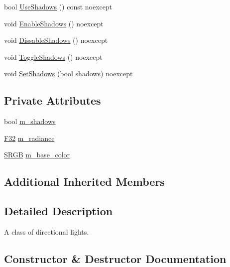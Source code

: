 \begin{DoxyCompactItemize}
\item 
bool \hyperlink{classmage_1_1_directional_light_a645e7f3d3e4dc4ebf11d7a6aa6950a18}{Use\+Shadows} () const noexcept
\item 
void \hyperlink{classmage_1_1_directional_light_a36436d5d99ccf6a0e49e81f26c3f9bc7}{Enable\+Shadows} () noexcept
\item 
void \hyperlink{classmage_1_1_directional_light_addd4803dee85892dfd57f51e155c6572}{Dissable\+Shadows} () noexcept
\item 
void \hyperlink{classmage_1_1_directional_light_a1c15d8e42526ed5ae7568cff5c7b25e0}{Toggle\+Shadows} () noexcept
\item 
void \hyperlink{classmage_1_1_directional_light_ab70b4298dc6616dbe22446e8e3298424}{Set\+Shadows} (bool shadows) noexcept
\end{DoxyCompactItemize}
\subsection*{Private Attributes}
\begin{DoxyCompactItemize}
\item 
bool \hyperlink{classmage_1_1_directional_light_a607a3dc01ee180f2044fe154c2b73903}{m\+\_\+shadows}
\item 
\hyperlink{namespacemage_aa97e833b45f06d60a0a9c4fc22ae02c0}{F32} \hyperlink{classmage_1_1_directional_light_aedba48c9e2590284f804ba7cc6225ec3}{m\+\_\+radiance}
\item 
\hyperlink{structmage_1_1_s_r_g_b}{S\+R\+GB} \hyperlink{classmage_1_1_directional_light_ad482c82fc399192409e24c03de2d2917}{m\+\_\+base\+\_\+color}
\end{DoxyCompactItemize}
\subsection*{Additional Inherited Members}


\subsection{Detailed Description}
A class of directional lights. 

\subsection{Constructor \& Destructor Documentation}
\hypertarget{classmage_1_1_directional_light_a688b26cb1d12d55258ae34bbac498465}{}\label{classmage_1_1_directional_light_a688b26cb1d12d55258ae34bbac498465} 
